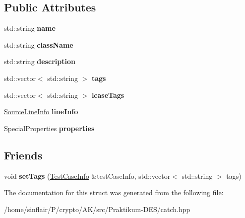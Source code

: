 \subsection*{Public Attributes}
\begin{DoxyCompactItemize}
\item 
\mbox{\label{structCatch_1_1TestCaseInfo_a463794e2f5cfead307c93efd134ade36}} 
std\+::string {\bfseries name}
\item 
\mbox{\label{structCatch_1_1TestCaseInfo_a1a5e0825132a38d091defdebbf2f8ce9}} 
std\+::string {\bfseries class\+Name}
\item 
\mbox{\label{structCatch_1_1TestCaseInfo_a37fe2db9425bc45f6a33893eac31198e}} 
std\+::string {\bfseries description}
\item 
\mbox{\label{structCatch_1_1TestCaseInfo_a150a7cbca1dd0c91799ccb14ff822eb0}} 
std\+::vector$<$ std\+::string $>$ {\bfseries tags}
\item 
\mbox{\label{structCatch_1_1TestCaseInfo_a844e3de9baf6e53cadfba9733c236bfe}} 
std\+::vector$<$ std\+::string $>$ {\bfseries lcase\+Tags}
\item 
\mbox{\label{structCatch_1_1TestCaseInfo_aa9407b7f442655b51a2aad24b3fa2fd3}} 
\hyperlink{structCatch_1_1SourceLineInfo}{Source\+Line\+Info} {\bfseries line\+Info}
\item 
\mbox{\label{structCatch_1_1TestCaseInfo_afc1e84bd7a2e180895a06d9131302af0}} 
Special\+Properties {\bfseries properties}
\end{DoxyCompactItemize}
\subsection*{Friends}
\begin{DoxyCompactItemize}
\item 
\mbox{\label{structCatch_1_1TestCaseInfo_a0fe44abaf18ae7c26f98a9fc2b08679c}} 
void {\bfseries set\+Tags} (\hyperlink{structCatch_1_1TestCaseInfo}{Test\+Case\+Info} \&test\+Case\+Info, std\+::vector$<$ std\+::string $>$ tags)
\end{DoxyCompactItemize}


The documentation for this struct was generated from the following file\+:\begin{DoxyCompactItemize}
\item 
/home/sinflair/\+P/crypto/\+A\+K/src/\+Praktikum-\/\+D\+E\+S/catch.\+hpp\end{DoxyCompactItemize}
